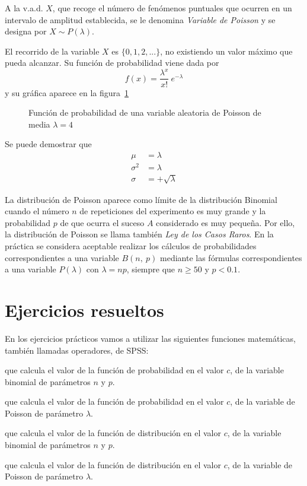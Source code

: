 A la v.a.d. $X$, que recoge el número de fenómenos puntuales que ocurren en un intervalo de amplitud establecida, se le denomina \emph{Variable de Poisson} y se designa por $X\sim P(\lambda)$.

El recorrido de la variable $X$ es $\{0,1,2,...\}$, no existiendo un
valor máximo que pueda alcanzar. Su función de probabilidad viene
dada por
\[
f(x) = \frac{{\lambda ^x }}{{x!}}\  e^{ - \lambda }
\]
y su gráfica aparece en la figura~\ref{g:poisson}

\begin{figure}[h!]
  \centering
  \scalebox{0.8}{} 
  \caption{Función de probabilidad de una variable aleatoria de Poisson de media $\lambda=4$}\label{g:poisson}
\end{figure}

Se puede demostrar que
\begin{align*}
\mu  &= \lambda\\
\sigma ^2  &= \lambda\\
\sigma  &=  + \sqrt {\lambda}
\end{align*}

La distribución de Poisson aparece como límite de la distribución
Binomial cuando el número $n$ de repeticiones del experimento es muy
grande y la probabilidad $p$ de que ocurra el suceso $A$ considerado
es muy pequeña. Por ello, la distribución de Poisson se llama
también \emph{Ley de los Casos Raros}. En la práctica se considera
aceptable realizar los cálculos de probabilidades correspondientes a
una variable $B(n,\ p)$ mediante las fórmulas correspondientes a una
variable $P(\lambda)$ con $\lambda=n p$, siempre que $n\geq 50$
y $p<0.1$.

\clearpage
\newpage


\section{Ejercicios resueltos}

En los ejercicios prácticos vamos a utilizar las
siguientes funciones matemáticas, también llamadas operadores, de
SPSS:

\begin{description}[leftmargin=*]
\item[PDF.BINOM $(c,n,p)$] que calcula el valor de la función de probabilidad
en el valor $c$, de la variable binomial de parámetros $n$ y $p$.

\item[PDF.POISSON $(c,\lambda)$] que calcula el valor de la función de probabilidad
en el valor $c$, de la variable de Poisson de parámetro $\lambda$.

\item[CDF.BINOM $(c,n,p)$] que calcula el valor de la función de distribución
en el valor $c$, de la variable binomial de parámetros $n$ y $p$.

\item[CDF.POISSON $(c,\lambda)$] que calcula el valor de la función de distribución
en el valor $c$, de la variable de Poisson de parámetro $\lambda$.
\end{description}

